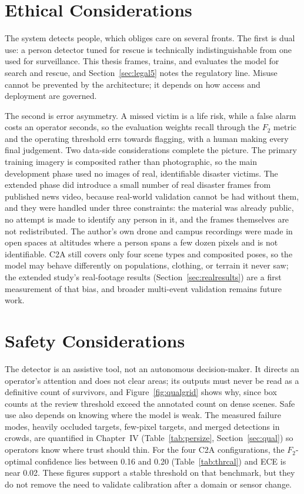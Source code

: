 \section{Ethical Considerations}
The system detects people, which obliges care on several fronts. The first is
dual use: a person detector tuned for rescue is technically indistinguishable
from one used for surveillance. This thesis frames, trains, and evaluates the
model for search and rescue, and Section~\ref{sec:legal5} notes the
regulatory line. Misuse cannot be prevented by the architecture; it depends on
how access and deployment are governed.

The second is error asymmetry. A missed victim is a life risk, while a false
alarm costs an operator seconds, so the evaluation weights recall through the
$F_2$ metric and the operating threshold errs towards flagging, with a human
making every final judgement. Two data-side considerations complete the
picture. The primary training imagery is composited rather than photographic,
so the main development phase used no images of real, identifiable disaster
victims. The extended phase did introduce a small number of real disaster
frames from published news video, because real-world validation cannot be had
without them, and they were handled under three constraints: the material was
already public, no attempt is made to identify any person in it, and the
frames themselves are not redistributed. The author's own drone and campus
recordings were made in open spaces at altitudes where a person spans a few
dozen pixels and is not identifiable. C2A still covers only four scene types
and composited poses, so the model may behave differently on populations,
clothing, or terrain it never saw; the extended study's real-footage results
(Section~\ref{sec:realresults}) are a first measurement of that bias, and
broader multi-event validation remains future work.

\section{Safety Considerations}
The detector is an assistive tool, not an autonomous decision-maker. It
directs an operator's attention and does not clear areas; its outputs must
never be read as a definitive count of survivors, and
Figure~\ref{fig:qualgrid} shows why, since box counts at the review threshold
exceed the annotated count on dense scenes. Safe use also depends on knowing
where the model is weak. The measured failure modes, heavily occluded
targets, few-pixel targets, and merged detections in crowds, are quantified
in Chapter~IV (Table~\ref{tab:persize}, Section~\ref{sec:qual}) so operators
know where trust should thin. For the four C2A configurations, the
$F_2$-optimal confidence lies between 0.16 and 0.20
(Table~\ref{tab:thrcal}) and ECE is near 0.02. These figures support a stable
threshold on that benchmark, but they do not remove the need to validate
calibration after a domain or sensor change.

